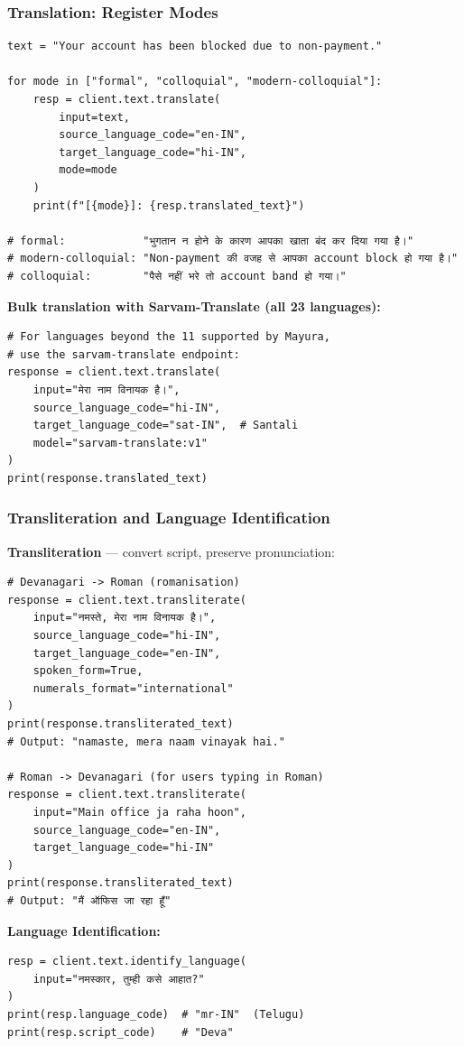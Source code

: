 \begin{frame}[fragile]\frametitle{Translation: Register Modes}
\begin{lstlisting}
text = "Your account has been blocked due to non-payment."

for mode in ["formal", "colloquial", "modern-colloquial"]:
    resp = client.text.translate(
        input=text,
        source_language_code="en-IN",
        target_language_code="hi-IN",
        mode=mode
    )
    print(f"[{mode}]: {resp.translated_text}")

# formal:            "भुगतान न होने के कारण आपका खाता बंद कर दिया गया है।"
# modern-colloquial: "Non-payment की वजह से आपका account block हो गया है।"
# colloquial:        "पैसे नहीं भरे तो account band हो गया।"
\end{lstlisting}

\textbf{Bulk translation with Sarvam-Translate (all 23 languages):}
\begin{lstlisting}
# For languages beyond the 11 supported by Mayura,
# use the sarvam-translate endpoint:
response = client.text.translate(
    input="मेरा नाम विनायक है।",
    source_language_code="hi-IN",
    target_language_code="sat-IN",  # Santali
    model="sarvam-translate:v1"
)
print(response.translated_text)
\end{lstlisting}
\end{frame}

\begin{frame}[fragile]\frametitle{Transliteration and Language Identification}
\textbf{Transliteration} --- convert script, preserve pronunciation:
\begin{lstlisting}
# Devanagari -> Roman (romanisation)
response = client.text.transliterate(
    input="नमस्ते, मेरा नाम विनायक है।",
    source_language_code="hi-IN",
    target_language_code="en-IN",
    spoken_form=True,
    numerals_format="international"
)
print(response.transliterated_text)
# Output: "namaste, mera naam vinayak hai."

# Roman -> Devanagari (for users typing in Roman)
response = client.text.transliterate(
    input="Main office ja raha hoon",
    source_language_code="en-IN",
    target_language_code="hi-IN"
)
print(response.transliterated_text)
# Output: "मैं ऑफिस जा रहा हूँ"
\end{lstlisting}

\textbf{Language Identification:}
\begin{lstlisting}
resp = client.text.identify_language(
    input="नमस्कार, तुम्ही कसे आहात?"
)
print(resp.language_code)  # "mr-IN"  (Telugu)
print(resp.script_code)    # "Deva"
\end{lstlisting}
\end{frame}


